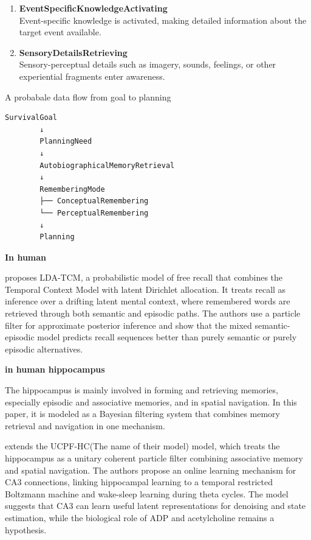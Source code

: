 \documentclass{book}
\providecommand{\ProjectDeepHeading}[2]{%
    \par\medskip\noindent\textbf{#2}\par\smallskip
}
\begin{document}
\begin{enumerate}
        \item \textbf{EventSpecificKnowledgeActivating}\\
        Event-specific knowledge is activated, making detailed information about the target event available.
        
        \item \textbf{SensoryDetailsRetrieving}\\
        Sensory-perceptual details such as imagery, sounds, feelings, or other experiential fragments enter awareness.
    \end{enumerate}
    
    
    A probabale data flow from goal to planning
    
    \begin{verbatim}
SurvivalGoal
        ↓
        PlanningNeed
        ↓
        AutobiographicalMemoryRetrieval
        ↓
        RememberingMode
        ├── ConceptualRemembering
        └── PerceptualRemembering
        ↓
        Planning
    \end{verbatim}


\ProjectDeepHeading{18}{In human}
        \cite{socher-2009-a-bayesian-analysis-of-dynamics-in-free-recall} proposes LDA-TCM, a probabilistic model of free recall that combines the Temporal Context Model with latent Dirichlet allocation. It treats recall as inference over a drifting latent mental context, where remembered words are retrieved through both semantic and episodic paths. The authors use a particle filter for approximate posterior inference and show that the mixed semantic-episodic model predicts recall sequences better than purely semantic or purely episodic alternatives.
        
        \ProjectDeepHeading{19}{in human hippocampus}
            The hippocampus is mainly involved in forming and retrieving memories, especially episodic and associative memories, and in spatial navigation. In this paper, it is modeled as a Bayesian filtering system that combines memory retrieval and navigation in one mechanism.
            
            \cite{fox-2010-learning-in-a-unitary-coherent-hippocampus} extends the UCPF-HC(The name of their model) model, which treats the hippocampus as a unitary coherent particle filter combining associative memory and spatial navigation.
            The authors propose an online learning mechanism for CA3 connections, linking hippocampal learning to a temporal restricted Boltzmann machine and wake-sleep learning during theta cycles.
            The model suggests that CA3 can learn useful latent representations for denoising and state estimation, while the biological role of ADP and acetylcholine remains a hypothesis.
    
\end{document}
